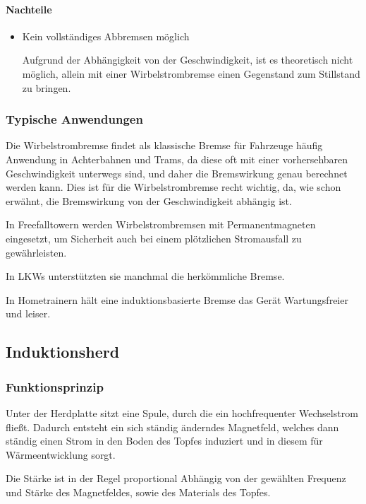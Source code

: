 \paragraph{Nachteile}

\begin{itemize}

	\item Kein vollständiges Abbremsen möglich
	
Aufgrund der Abhängigkeit von der Geschwindigkeit, ist es theoretisch nicht möglich, allein mit einer Wirbelstrombremse einen Gegenstand zum Stillstand zu bringen.

\end{itemize}


\subsubsection{Typische Anwendungen}

Die Wirbelstrombremse findet als klassische Bremse für Fahrzeuge häufig Anwendung in Achterbahnen und Trams, da diese oft mit einer vorhersehbaren Geschwindigkeit unterwegs sind, und daher die Bremswirkung genau berechnet werden kann. Dies ist für die Wirbelstrombremse recht wichtig, da, wie schon erwähnt, die Bremswirkung von der Geschwindigkeit abhängig ist.

In Freefalltowern werden Wirbelstrombremsen mit Permanentmagneten eingesetzt, um Sicherheit auch bei einem plötzlichen Stromausfall zu gewährleisten.

In LKWs unterstützten sie manchmal die herkömmliche Bremse.

In Hometrainern hält eine induktionsbasierte Bremse das Gerät Wartungsfreier und leiser.


\subsection{Induktionsherd}

\subsubsection{Funktionsprinzip}

Unter der Herdplatte sitzt eine Spule, durch die ein hochfrequenter Wechselstrom fließt. Dadurch entsteht ein sich ständig änderndes Magnetfeld, welches dann ständig einen Strom in den Boden des Topfes induziert und in diesem für Wärmeentwicklung sorgt.

Die Stärke ist in der Regel proportional Abhängig von der gewählten Frequenz und Stärke des Magnetfeldes, sowie des Materials des Topfes.


